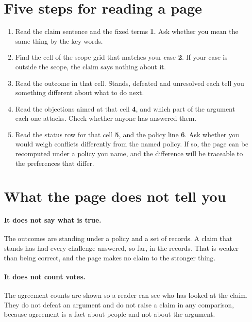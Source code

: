 \documentclass[11pt]{article}
\newcommand{\mk}[1]{\textcircled{\scriptsize\bfseries #1}}
\begin{document}
\section{Five steps for reading a page}\label{sec:steps}

\begin{enumerate}[label=\textbf{\arabic*.}, nosep]
\item Read the claim sentence and the fixed terms \mk{1}. Ask whether you mean the same thing by the key words.
\item Find the cell of the scope grid that matches your case \mk{2}. If your case is outside the scope, the claim says nothing about it.
\item Read the outcome in that cell. Stands, defeated and unresolved each tell you something different about what to do next.
\item Read the objections aimed at that cell \mk{4}, and which part of the argument each one attacks. Check whether anyone has answered them.
\item Read the status row for that cell \mk{5}, and the policy line \mk{6}. Ask whether you would weigh conflicts differently from the named policy. If so, the page can be recomputed under a policy you name, and the difference will be traceable to the preferences that differ.
\end{enumerate}

\section{What the page does not tell you}\label{sec:nottell}

\paragraph{It does not say what is true.} The outcomes are standing under a policy and a set of records. A claim that stands has had every challenge answered, so far, in the records. That is weaker than being correct, and the page makes no claim to the stronger thing.

\paragraph{It does not count votes.} The agreement counts are shown so a reader can see who has looked at the claim. They do not defeat an argument and do not raise a claim in any comparison, because agreement is a fact about people and not about the argument.
\end{document}
